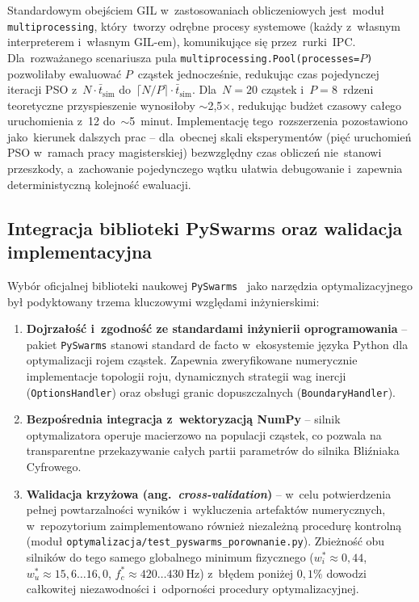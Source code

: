 Standardowym obejściem GIL w~zastosowaniach obliczeniowych jest~moduł \texttt{multiprocessing}, który~tworzy odrębne procesy systemowe (każdy z~własnym interpreterem i~własnym GIL-em), komunikujące się przez~rurki~IPC. Dla~rozważanego scenariusza pula \texttt{multiprocessing.Pool(processes=$P$)} pozwoliłaby ewaluować $P$~cząstek jednocześnie, redukując czas pojedynczej iteracji PSO z~$N\cdot\bar t_{\mathrm{sim}}$ do~$\lceil N/P\rceil\cdot\bar t_{\mathrm{sim}}$. Dla~$N=20$ cząstek i~$P=8$~rdzeni teoretyczne przyspieszenie wynosiłoby $\sim$2{,}5$\times$, redukując budżet czasowy całego uruchomienia z~12 do~$\sim$5~minut. Implementację tego~rozszerzenia pozostawiono jako~kierunek dalszych prac -- dla~obecnej skali eksperymentów (pięć uruchomień PSO w~ramach pracy magisterskiej) bezwzględny czas obliczeń nie~stanowi przeszkody, a~zachowanie pojedynczego wątku ułatwia debugowanie i~zapewnia deterministyczną kolejność ewaluacji.

\subsection{Integracja biblioteki PySwarms oraz walidacja implementacyjna}

Wybór oficjalnej biblioteki naukowej \texttt{PySwarms}~\cite{miranda2018pyswarms} jako narzędzia optymalizacyjnego był podyktowany trzema kluczowymi względami inżynierskimi:
\begin{enumerate}
    \item \textbf{Dojrzałość i~zgodność ze standardami inżynierii oprogramowania} -- pakiet \texttt{PySwarms} stanowi standard de facto w~ekosystemie języka Python dla optymalizacji rojem cząstek. Zapewnia zweryfikowane numerycznie implementacje topologii roju, dynamicznych strategii wag inercji (\texttt{OptionsHandler}) oraz obsługi granic dopuszczalnych (\texttt{BoundaryHandler}).
    \item \textbf{Bezpośrednia integracja z~wektoryzacją NumPy} -- silnik optymalizatora operuje macierzowo na populacji cząstek, co pozwala na transparentne przekazywanie całych partii parametrów do silnika Bliźniaka Cyfrowego.
    \item \textbf{Walidacja krzyżowa (ang.~\emph{cross-validation})} -- w~celu potwierdzenia pełnej powtarzalności wyników i~wykluczenia artefaktów numerycznych, w~repozytorium zaimplementowano również niezależną procedurę kontrolną (moduł \texttt{optymalizacja/test\_pyswarms\_porownanie.py}). Zbieżność obu silników do tego samego globalnego minimum fizycznego ($w_i^* \approx 0{,}44$, $w_u^* \approx 15{,}6\dots 16{,}0$, $f_c^* \approx 420\dots 430~\mathrm{Hz}$) z~błędem poniżej $0{,}1\%$ dowodzi całkowitej niezawodności i~odporności procedury optymalizacyjnej.
\end{enumerate}
